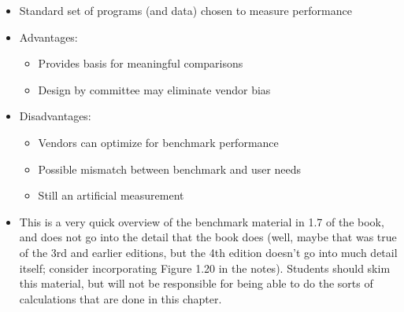 \begin{frame}[fragile]
\begin{itemize}
	\item Standard set of programs (and data) chosen to measure
	performance
	\item Advantages:
	\begin{itemize}
		\item Provides basis for meaningful comparisons
		\item Design by committee may eliminate vendor bias
	\end{itemize}
	\item Disadvantages:
	\begin{itemize}
		\item Vendors can optimize for benchmark performance
		\item Possible mismatch between benchmark and user needs
		\item Still an artificial measurement
	\end{itemize}
\end{itemize}
\BNotes\ifnum{}
{
\begin{itemize}
\item This is a very quick overview of the benchmark material in 1.7 of the
book, and does not go into the detail that the book does (well, maybe that
was true of the 3rd and earlier editions, but the 4th edition doesn't go
into much detail itself; consider incorporating Figure 1.20 in the notes). 
Students
should skim this material, but will not be responsible for being able
to do the sorts of calculations that are done in this chapter.
\end{itemize}
}
\fi\ENotes
\end{frame}





